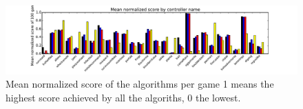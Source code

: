\begin{figure}
	\centering
	\includegraphics[width=\textwidth]{includes/scores}
	\vspace{-.8cm}
	\caption{Mean normalized score of the algorithms per game 1 means the
	highest score achieved by all the algoriths, 0 the lowest.}
	\label{fig:scores}
\end{figure}
\begin{figure}
	\centering
\end{figure}
